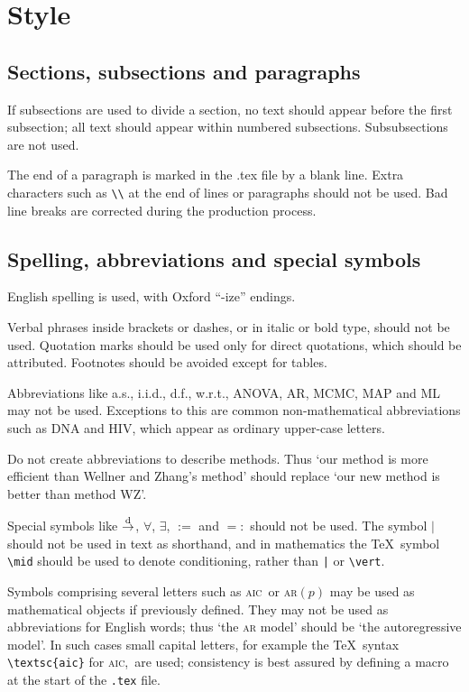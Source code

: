 \documentclass[lineno]{biometrika}
\def\AIC{\textsc{aic}}
\begin{document}
\section{Style}

\subsection{Sections, subsections and paragraphs}

If subsections are used to divide a section, no text should appear before the first subsection; all text should appear within numbered subsections.  Subsubsections are not used.

The end of a paragraph is marked in the .tex file by a blank line.  Extra characters such as \verb+\\+ at the end of lines or paragraphs should not be used.  Bad line breaks are corrected during the production process.

\subsection{Spelling, abbreviations and special symbols}

English spelling is used, with Oxford ``-ize'' endings.

Verbal phrases inside brackets or dashes, or in italic or bold type, should not be used. Quotation marks should be used only for direct quotations, which should be attributed. Footnotes should be avoided except for tables.

Abbreviations like a.s., i.i.d., d.f., w.r.t.,  ANOVA, AR, MCMC, MAP and ML may not be used.  Exceptions to this are common non-mathematical abbreviations such as DNA and HIV, which appear as ordinary upper-case letters.

Do not create abbreviations to describe methods. Thus `our method is more efficient than Wellner and Zhang's method' should replace `our new method is better than method WZ'.

Special symbols like $\mathop{\rightarrow}\limits^{\rm d}$, $\forall$, $\exists$, $:=$ and $=:$  should not be used.  The symbol $\mid$ should not be used in text as shorthand, and in mathematics the \TeX\ symbol \verb+\mid+ should be used to denote conditioning, rather than \verb+|+ or \verb"\vert".

Symbols comprising several letters such as \AIC\ or \textsc{ar}$(p)$ may be used as mathematical objects if previously defined. They may not be used as abbreviations for English words; thus `the \textsc{ar} model' should be `the autoregressive model'.   In such cases small capital letters, for example the  \TeX\ syntax \verb+\textsc{aic}+ for \AIC,\ are used; consistency is best assured by defining a macro at the start of the \texttt{.tex}  file.
\end{document}
